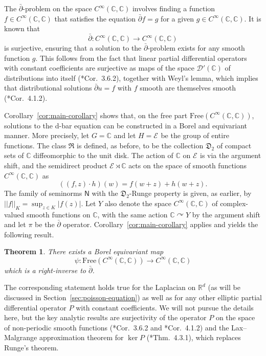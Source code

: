 \documentclass[12pt]{paper}
\numberwithin{equation}{section}
\theoremstyle{plain}
\newtheorem{theorem}{Theorem}[section]
\theoremstyle{definition}
\newcommand{\C}{\mathbb{C}}
\newcommand{\Rd}{\mathbb{R}^{d}}
\newcommand{\mfD}{\mathfrak{D}}
\newcommand{\mfR}{\mathfrak{R}}
\newcommand{\smooth}[2][]{C^{\infty}_{#1}(#2)}
\newcommand{\smoothCC}{\smooth{\C,\C}}
\newcommand{\distrib}[1]{\mathscr{D}'(#1)}
\newcommand{\holom}[1][]{\mathcal{E}_{#1}}
\newcommand{\unifn}{\mathsf{N}}
\newcommand{\acts}{\curvearrowright}
\newcommand{\norm}[1]{||#1||}
\newcommand{\free}{\mathrm{Free}}
\begin{document}
The \(\bar{\partial}\)-problem on the space \(\smoothCC\) involves finding a function
\(f \in \smoothCC\) that satisfies the equation \(\bar{\partial} f = g\) for a given
\(g \in \smoothCC\).  It is known that
\[
\bar{\partial} : \smoothCC \to \smoothCC
\]
is surjective, ensuring that a solution to the \(\bar{\partial}\)-problem exists for any smooth function \(g\).
This follows from the fact that linear partial differential operators with constant coefficients are
surjective as maps of the space \(\distrib{\C}\) of distributions into itself
(\cite{hormanderAnalysisLinearPartial2003}*{Cor.~3.6.2}), together with Weyl's lemma, which implies
that distributional solutions \(\bar\partial u=f\) with \(f\) smooth are themselves smooth
(\cite{hormanderAnalysisLinearPartial2003}*{Cor.~4.1.2}).

Corollary~\ref{cor:main-corollary} shows that, on the free part \(\free(\smoothCC)\), solutions to
the d-bar equation can be constructed in a Borel and equivariant manner.  More precisely, let
\(G = \C\) and let \(H = \holom\) be the group of entire functions.  The class \(\mfR\) is defined,
as before, to be the collection \(\mfD_{2}\) of compact sets of \(\C\) diffeomorphic to the unit
disk. The action of \(\C \) on \( \holom\) is via the argument shift, and the semidirect product
\(\holom \rtimes \C \) acts on the space of smooth functions \(\smoothCC\) as
\[
((f,z) \cdot h)(w) = f(w+z) + h(w+z).
\]
The family of seminorms \(\unifn\) with the
\(\mfD_{2}\)-Runge property is given, as earlier, by \(\norm{f}_{K} = \sup_{z \in K}|f(z)|\).  Let
\(Y\) also denote the space \(\smoothCC\) of complex-valued smooth functions on \(\C\), with the
same action \(\C \acts Y\) by the argument shift and let \(\pi\) be the \(\bar{\partial}\) operator.
Corollary~\ref{cor:main-corollary} applies and yields the following result.

\begin{theorem}
  \label{thm:d-bar-problem}
  There exists a Borel equivariant map \[\psi : \free(\smoothCC) \to \smoothCC\]
  which is a right-inverse to \(\bar{\partial}\).
\end{theorem}

The corresponding statement holds true for the Laplacian on \(\Rd\) (as will be discussed in
Section~\ref{sec:poisson-equation}) as well as for any other elliptic partial differential operator
\(P\) with constant coefficients.  We will not pursue the details here, but the key analytic results
are surjectivity of the operator \(P\) on the space of non-periodic smooth functions
(\cite{hormanderAnalysisLinearPartial2003}*{Cor.~3.6.2} and
\cite{hormanderAnalysisLinearPartial2003}*{Cor.~4.1.2}) and the Lax--Malgrange approximation theorem
for \(\ker P\) (\cite{hormanderAnalysisLinearPartial2003}*{Thm.~4.3.1}), which replaces Runge's
theorem.
\end{document}
